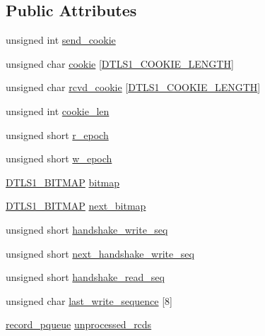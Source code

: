 \subsection*{Public Attributes}
\begin{DoxyCompactItemize}
\item 
unsigned int \hyperlink{structdtls1__state__st_af87b8915e3c04aa1e8c858e15a967b2d}{send\+\_\+cookie}
\item 
unsigned char \hyperlink{structdtls1__state__st_a3600731c890da666b152e0bea4b17644}{cookie} \mbox{[}\hyperlink{dtls1_8h_a5c451434dd0ce6f73bd2cf57134ee864}{D\+T\+L\+S1\+\_\+\+C\+O\+O\+K\+I\+E\+\_\+\+L\+E\+N\+G\+TH}\mbox{]}
\item 
unsigned char \hyperlink{structdtls1__state__st_a1a9425f1e37d872f3cc13026092b4ac6}{rcvd\+\_\+cookie} \mbox{[}\hyperlink{dtls1_8h_a5c451434dd0ce6f73bd2cf57134ee864}{D\+T\+L\+S1\+\_\+\+C\+O\+O\+K\+I\+E\+\_\+\+L\+E\+N\+G\+TH}\mbox{]}
\item 
unsigned int \hyperlink{structdtls1__state__st_aa91963cca02aa5c981c3c1d5c3c6e472}{cookie\+\_\+len}
\item 
unsigned short \hyperlink{structdtls1__state__st_aa3c8e7915e684e4d99aef7e102c57479}{r\+\_\+epoch}
\item 
unsigned short \hyperlink{structdtls1__state__st_ac2348d97c73af669675caa7791fc7320}{w\+\_\+epoch}
\item 
\hyperlink{dtls1_8h_a7c7329402802de09daba80b9c492e8dc}{D\+T\+L\+S1\+\_\+\+B\+I\+T\+M\+AP} \hyperlink{structdtls1__state__st_a3e9ffaed4676ae794845eed4755ef8ce}{bitmap}
\item 
\hyperlink{dtls1_8h_a7c7329402802de09daba80b9c492e8dc}{D\+T\+L\+S1\+\_\+\+B\+I\+T\+M\+AP} \hyperlink{structdtls1__state__st_a2ef30a3f09e71c8d936db1f4a8a68c10}{next\+\_\+bitmap}
\item 
unsigned short \hyperlink{structdtls1__state__st_ac14d838ba2fa596ab378ac07bee6e0c8}{handshake\+\_\+write\+\_\+seq}
\item 
unsigned short \hyperlink{structdtls1__state__st_ae5ce4e4dc2d5625594b6c7a339198a23}{next\+\_\+handshake\+\_\+write\+\_\+seq}
\item 
unsigned short \hyperlink{structdtls1__state__st_a928b4ab02c52ca660cb46762133b21bb}{handshake\+\_\+read\+\_\+seq}
\item 
unsigned char \hyperlink{structdtls1__state__st_aceeaa0dd2d3f7a47a99a85c8db8013ea}{last\+\_\+write\+\_\+sequence} \mbox{[}8\mbox{]}
\item 
\hyperlink{dtls1_8h_aac9fce3ec0c12051ecb4de0e531747f8}{record\+\_\+pqueue} \hyperlink{structdtls1__state__st_ada130633ccbd3372ee777efb93c953a9}{unprocessed\+\_\+rcds}

\end{DoxyCompactItemize}
